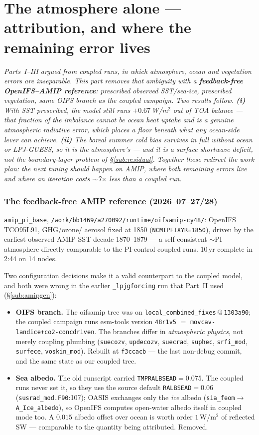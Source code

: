 \documentclass[10pt]{article}
\begin{document}
\clearpage
\part{The atmosphere alone --- attribution, and where the remaining error lives}
\emph{Parts~I--III argued from coupled runs, in which atmosphere, ocean and vegetation errors are
inseparable. This part removes that ambiguity with a \textbf{feedback-free OpenIFS--AMIP reference}:
prescribed observed SST/sea-ice, prescribed vegetation, same OIFS branch as the coupled campaign.
Two results follow. \textbf{(i)} With SST prescribed, the model still runs $+0.67$\,W/m$^2$ out of TOA
balance --- that fraction of the imbalance cannot be ocean heat uptake and is a genuine atmospheric
radiative error, which places a \emph{floor} beneath what any ocean-side lever can achieve.
\textbf{(ii)} The boreal \emph{summer} cold bias survives in full without ocean or LPJ-GUESS, so it is
the atmosphere's --- and it is a surface \emph{shortwave} deficit, not the boundary-layer problem of
\S\ref{sub:residual}. Together these redirect the work plan: the next tuning should happen on AMIP,
where both remaining errors live and where an iteration costs $\sim$7$\times$ less than a coupled run.}

\section{The feedback-free AMIP reference (2026--07--27/28)}\label{sec:amip}
\texttt{amip\_pi\_base}, \texttt{/work/bb1469/a270092/runtime/oifsamip-cy48/}: OpenIFS TCO95L91, GHG/ozone/
aerosol fixed at 1850 (\texttt{NCMIPFIXYR=1850}), driven by the earliest observed AMIP SST decade
1870--1879 --- a self-consistent $\sim$PI atmosphere directly comparable to the PI-control coupled runs.
10\,yr complete in 2:44 on 14 nodes.

Two configuration decisions make it a valid counterpart to the coupled model, and both were wrong in the
earlier \texttt{\_lpjgforcing} run that Part~II used (\S\ref{sub:amipgen}):
\begin{itemize}\itemsep1pt
\item \textbf{OIFS branch.} The oifsamip tree was on \texttt{local\_combined\_fixes}\,@\,\texttt{1303a90};
the coupled campaign runs esm-tools version \texttt{48r1v5} $=$ \texttt{movcav-landice+co2-concdriven}.
The branches differ in \emph{atmospheric physics}, not merely coupling plumbing (\texttt{suecozv},
\texttt{updecozv}, \texttt{suecrad}, \texttt{suphec}, \texttt{srfi\_mod}, \texttt{surfece},
\texttt{voskin\_mod}). Rebuilt at \texttt{f3ccacb} --- the last non-debug commit, and the same state as
our coupled tree.
\item \textbf{Sea albedo.} The old runscript carried \texttt{TMPRALBSEAD}$=0.075$. The coupled runs never
set it, so they use the source default \texttt{RALBSEAD}$=0.06$ (\texttt{susrad\_mod.F90}:107); OASIS
exchanges only the \emph{ice} albedo (\texttt{sia\_feom}$\to$\texttt{A\_Ice\_albedo}), so OpenIFS computes
open-water albedo itself in coupled mode too. A $0.015$ albedo offset over ocean is worth order
$1$\,W/m$^2$ of reflected SW --- comparable to the quantity being attributed. Removed.
\end{itemize}
\end{document}
